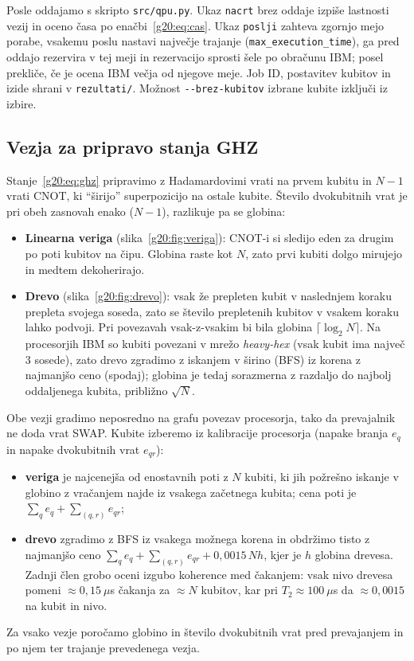 Posle oddajamo s skripto \texttt{src/qpu.py}. Ukaz \texttt{nacrt} brez oddaje izpiše lastnosti vezij in oceno časa po
enačbi~\eqref{g20:eq:cas}. Ukaz \texttt{poslji} zahteva zgornjo mejo porabe, vsakemu poslu nastavi največje trajanje
(\texttt{max\_execution\_time}), ga pred oddajo rezervira v tej meji in rezervacijo sprosti šele po obračunu IBM; posel prekliče, če je ocena
IBM večja od njegove meje. Job ID, postavitev kubitov in izide shrani v \texttt{rezultati/}. Možnost \texttt{-{}-brez-kubitov} izbrane kubite
izključi iz izbire.

\subsection{Vezja za pripravo stanja GHZ}
\label{g20:sec:vezja}

Stanje~\eqref{g20:eq:ghz} pripravimo z Hadamardovimi vrati na prvem kubitu in $N-1$ vrati CNOT, ki \enquote{širijo}
superpozicijo na ostale kubite. Število dvokubitnih vrat je pri obeh zasnovah enako ($N-1$), razlikuje pa se globina:

\begin{itemize}
\item \textbf{Linearna veriga} (slika~\ref{g20:fig:veriga}): CNOT-i si sledijo eden za drugim po poti kubitov na čipu.
      Globina raste kot $N$, zato prvi kubiti dolgo mirujejo in medtem dekoherirajo.
\item \textbf{Drevo} (slika~\ref{g20:fig:drevo}): vsak že prepleten kubit v naslednjem koraku prepleta svojega soseda, zato
      se število prepletenih kubitov v vsakem koraku lahko podvoji. Pri povezavah vsak-z-vsakim bi bila globina
      $\lceil\log_2 N\rceil$. Na procesorjih IBM so kubiti povezani v mrežo \emph{heavy-hex} (vsak kubit ima največ 3 sosede),
      zato drevo zgradimo z iskanjem v širino (BFS) iz korena z najmanjšo ceno (spodaj); globina je tedaj sorazmerna z
      razdaljo do najbolj oddaljenega kubita, približno $\sqrt{N}$.
\end{itemize}
Obe vezji gradimo neposredno na grafu povezav procesorja, tako da prevajalnik ne doda vrat SWAP. Kubite izberemo iz
kalibracije procesorja (napake branja $e_q$ in napake dvokubitnih vrat $e_{qr}$):
\begin{itemize}
\item \textbf{veriga} je najcenejša od enostavnih poti z $N$ kubiti, ki jih požrešno iskanje v globino z vračanjem najde iz vsakega
      začetnega kubita; cena poti je
      $\sum_q e_q + \sum_{(q,r)} e_{qr}$;
\item \textbf{drevo} zgradimo z BFS iz vsakega možnega korena in obdržimo tisto z najmanjšo ceno
      $\sum_q e_q + \sum_{(q,r)} e_{qr} + 0{,}0015\,N h$, kjer je $h$ globina drevesa. Zadnji člen grobo oceni izgubo koherence
      med čakanjem: vsak nivo drevesa pomeni $\approx 0{,}15~\mu$s čakanja za $\approx N$ kubitov, kar pri $T_2\approx100~\mu$s
      da $\approx 0{,}0015$ na kubit in nivo.
\end{itemize}
Za vsako vezje poročamo globino in število dvokubitnih vrat pred prevajanjem in po njem ter trajanje prevedenega vezja.

